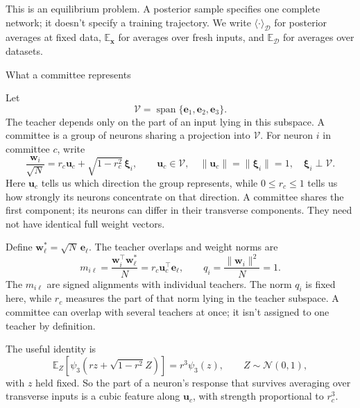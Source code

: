 \documentclass[11pt, reqno]{amsart}
\makeatletter
\def\section{\@startsection{section}{1}%
  \z@{.7\linespacing\@plus\linespacing}{.5\linespacing}%
  {\normalfont\scshape\centering}}
\theoremstyle{notestyle}
\theoremstyle{defstyle}
\makeatother
\begin{document}
This is an equilibrium problem. A posterior sample specifies one
complete network; it doesn't specify a training trajectory. We write
$\langle\cdot\rangle_{\mathcal D}$ for posterior averages at fixed data,
$\mathbb E_{\mathbf x}$ for averages over fresh inputs, and
$\mathbb E_{\mathcal D}$ for averages over datasets.

\section{What a committee represents}

Let
\begin{equation}
 \mathcal V=\operatorname{span}
 \{\mathbf e_1,\mathbf e_2,\mathbf e_3\}.
\end{equation}
The teacher depends only on the part of an input lying in this
subspace. A committee is a group of neurons sharing a projection into
$\mathcal V$. For neuron $i$ in committee $c$, write
\begin{equation}
 \frac{\mathbf w_i}{\sqrt N}
 =r_c\mathbf u_c+\sqrt{1-r_c^2}\,\boldsymbol\xi_i,\qquad
 \mathbf u_c\in\mathcal V,\quad
 \|\mathbf u_c\|=\|\boldsymbol\xi_i\|=1,\quad
 \boldsymbol\xi_i\perp\mathcal V.
\end{equation}
Here $\mathbf u_c$ tells us which direction the group represents,
while $0\leq r_c\leq1$ tells us how strongly its neurons concentrate on that
direction. A committee shares the first component; its neurons can
differ in their transverse components. They need not have identical
full weight vectors.

Define $\mathbf w_\ell^*=\sqrt N\,\mathbf e_\ell$. The teacher overlaps
and weight norms are
\begin{equation}
 m_{i\ell}=\frac{\mathbf w_i^\top\mathbf w_\ell^*}{N}
 =r_c\mathbf u_c^\top\mathbf e_\ell,\qquad
 q_i=\frac{\|\mathbf w_i\|^2}{N}=1.
\end{equation}
The $m_{i\ell}$ are signed alignments with individual teachers.
The norm $q_i$ is fixed here, while $r_c$ measures the part of that
norm lying in the teacher subspace. A committee can overlap with
several teachers at once; it isn't assigned to one teacher by
definition.

The useful identity is
\begin{equation}
 \mathbb E_Z\!\left[
 \psi_3(rz+\sqrt{1-r^2}Z)\right]=r^3\psi_3(z),
 \qquad Z\sim\mathcal N(0,1),
\end{equation}
with $z$ held fixed. So the part of a neuron's response that survives
averaging over transverse inputs is a cubic feature along
$\mathbf u_c$, with strength proportional to $r_c^3$.
\end{document}
